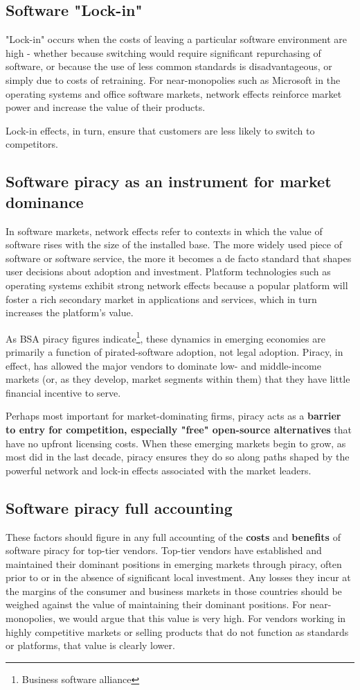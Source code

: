 \documentclass[times, utf8, seminar]{fit}
\begin{document}
\subsection{Software "Lock-in"}
"Lock-in" occurs when the costs of leaving a particular software environment are high - whether because switching would require significant repurchasing of software, or because the use of less common standards is disadvantageous, or simply due to costs of retraining. For near-monopolies such as Microsoft in the operating systems and office software markets, network effects reinforce market power and increase the value of their products.

Lock-in effects, in turn, ensure that customers are less likely to switch to competitors.

\subsection{Software piracy as an instrument for market dominance}  
In software markets, network effects refer to contexts in which the value of software rises with the size of the installed base. The more widely used piece of software or software service, the more it becomes a de facto standard that shapes user decisions about adoption and investment. Platform technologies such as operating systems exhibit strong network effects because a popular platform will foster a rich secondary market in applications and services, which in turn increases the platform’s value. 

As BSA piracy figures indicate\footnote{Business software alliance}, these dynamics in emerging economies are primarily a function of pirated-software adoption, not legal adoption. Piracy, in effect, has allowed the major vendors to dominate low- and middle-income markets (or, as they develop, market segments within them) that they have little financial incentive to serve. 

Perhaps most important for market-dominating firms, piracy acts as a \textbf{barrier to entry for competition, especially "free" open-source alternatives} that have no upfront licensing costs. When these emerging markets begin to grow, as most did in the last decade, piracy ensures they do so along paths shaped by the powerful network and lock-in effects associated with the market leaders.

\subsection{Software piracy full accounting}
These factors should figure in any full accounting of the \textbf{costs} and \textbf{benefits} of software piracy for top-tier vendors. Top-tier vendors have established and maintained their dominant positions in emerging markets through piracy, often prior to or in the absence of significant local investment. Any losses they incur at the margins of the consumer and business markets in those countries should be weighed against the value of maintaining their dominant positions. For near-monopolies, we would argue that this value is very high. For vendors working in highly competitive markets or selling products that do not function as standards or platforms, that value is clearly lower.\citep{mediapiracy}
\end{document}
